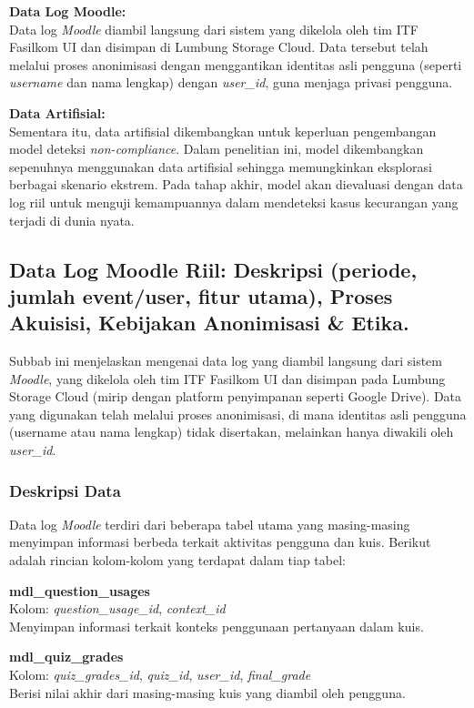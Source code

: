 \textbf{Data Log Moodle:} \\
Data log \textit{Moodle} diambil langsung dari sistem yang dikelola oleh tim ITF Fasilkom UI dan disimpan di Lumbung Storage Cloud. Data tersebut telah melalui proses anonimisasi dengan menggantikan identitas asli pengguna (seperti \textit{username} dan nama lengkap) dengan \textit{user\_id}, guna menjaga privasi pengguna.

\textbf{Data Artifisial:} \\
Sementara itu, data artifisial dikembangkan untuk keperluan pengembangan model deteksi \textit{non-compliance}. Dalam penelitian ini, model dikembangkan sepenuhnya menggunakan data artifisial sehingga memungkinkan eksplorasi berbagai skenario ekstrem. Pada tahap akhir, model akan dievaluasi dengan data log riil untuk menguji kemampuannya dalam mendeteksi kasus kecurangan yang terjadi di dunia nyata.

\subsection{Data Log Moodle Riil: Deskripsi (periode, jumlah event/user, fitur utama), Proses Akuisisi, Kebijakan Anonimisasi \& Etika.}
\label{sec:logRiil}
Subbab ini menjelaskan mengenai data log yang diambil langsung dari sistem \textit{Moodle}, yang dikelola oleh tim ITF Fasilkom UI dan disimpan pada Lumbung Storage Cloud (mirip dengan platform penyimpanan seperti Google Drive). Data yang digunakan telah melalui proses anonimisasi, di mana identitas asli pengguna (username atau nama lengkap) tidak disertakan, melainkan hanya diwakili oleh \textit{user\_id}.

\subsubsection{Deskripsi Data}
\label{sec:deskripsiData}
Data log \textit{Moodle} terdiri dari beberapa tabel utama yang masing-masing menyimpan informasi berbeda terkait aktivitas pengguna dan kuis. Berikut adalah rincian kolom-kolom yang terdapat dalam tiap tabel:

\textbf{mdl\_question\_usages} \\
Kolom: \textit{question\_usage\_id}, \textit{context\_id} \\
Menyimpan informasi terkait konteks penggunaan pertanyaan dalam kuis.

\textbf{mdl\_quiz\_grades} \\
Kolom: \textit{quiz\_grades\_id}, \textit{quiz\_id}, \textit{user\_id}, \textit{final\_grade} \\
Berisi nilai akhir dari masing-masing kuis yang diambil oleh pengguna.

